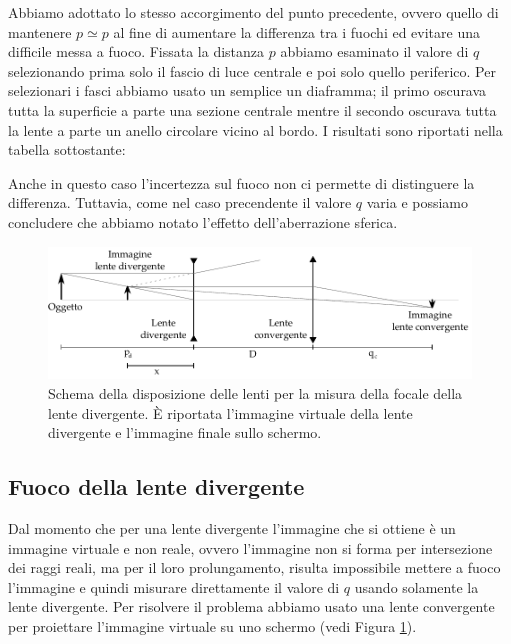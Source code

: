 Abbiamo adottato lo stesso accorgimento del punto precedente, ovvero quello di mantenere $p \simeq p$ al fine di aumentare la differenza tra i fuochi ed evitare una difficile messa a fuoco. Fissata la distanza $p$ abbiamo esaminato il valore di $q$ selezionando prima solo il fascio di luce centrale e poi solo quello periferico. Per selezionari i fasci abbiamo usato un semplice un diaframma; il primo oscurava tutta la superficie a parte una sezione centrale mentre il secondo oscurava tutta la lente a parte un anello circolare vicino al bordo.
I risultati sono riportati nella tabella sottostante:



Anche in questo caso l'incertezza sul fuoco non ci permette di distinguere la differenza. Tuttavia, come nel caso precendente il valore $q$ varia e possiamo concludere che abbiamo notato l'effetto dell'aberrazione sferica.

\begin{figure}[h!]
	\includegraphics[width=16cm]{drawing2.pdf}
    \caption{Schema della disposizione delle lenti per la misura della focale della lente divergente. È riportata l'immagine
    virtuale della lente divergente e l'immagine finale sullo schermo.}
    \label{fig:div}
\end{figure}

\subsection{Fuoco della lente divergente}

Dal momento che per una lente divergente l'immagine che si ottiene è un immagine virtuale e non reale, ovvero l'immagine non si forma per intersezione dei raggi reali, ma per il loro prolungamento, risulta impossibile mettere a fuoco l'immagine e quindi misurare direttamente il valore di $q$ usando solamente la lente divergente.
Per risolvere il problema abbiamo usato una lente convergente per proiettare l'immagine virtuale su uno schermo (vedi Figura \ref{fig:div}).


